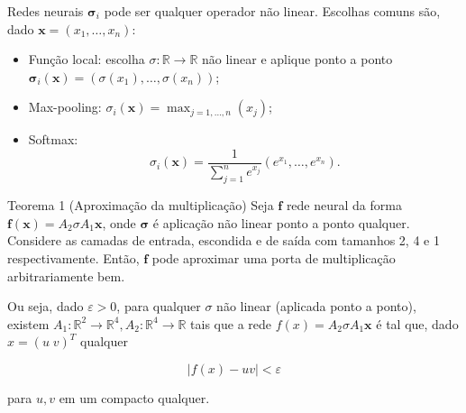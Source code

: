 \documentclass{beamer}
\begin{document}
\begin{frame}{Redes neurais}
    $\mathbf \sigma_i$ pode ser qualquer operador não linear. Escolhas comuns são, dado $\mathbf x = (x_1, \dots, x_n)$:

    \begin{itemize}
        \item Função local: escolha $\sigma : \mathbb R \to \mathbb R$ não linear e aplique ponto a ponto $\mathbf \sigma_i(\mathbf x) = (\sigma(x_1),\dots,\sigma(x_n))$; \pause \\
        \item Max-pooling: $\sigma_i (\mathbf x) = \max_{j=1,\dots,n} (x_j)$; \pause \\
        \item Softmax: \[
            \sigma_i(\mathbf x) = \frac{1}{\sum_{j=1}^n e^{x_j}}(e^{x_1}, \dots, e^{x_n}). 
        \]
    \end{itemize}

\end{frame}

\begin{frame}{Teorema 1 (Aproximação da multiplicação)}
    Seja $\mathbf f$ rede neural da forma $\mathbf f (\mathbf x) = A_2 \sigma A_1\mathbf x$, onde $\mathbf \sigma$ é aplicação não linear ponto a ponto qualquer. Considere as camadas de entrada, escondida e de saída com tamanhos 2, 4 e 1 respectivamente. Então, $\mathbf f$ pode aproximar uma porta de multiplicação arbitrariamente bem.

    Ou seja, dado $\varepsilon>0$, para qualquer $\sigma$ não linear (aplicada ponto a ponto), existem  $A_1:\mathbb R^2 \to \mathbb R^4, A_2:\mathbb R^4 \to \mathbb R$ tais que a rede $f(x) = A_2 \sigma A_1 \mathbf{x}$ é tal que, dado $x=(u \; v)^T$ qualquer

    \[
        |f(x) - uv|<\varepsilon
    \]

    para $u,v$ em um compacto qualquer.

\end{frame}
\end{document}
